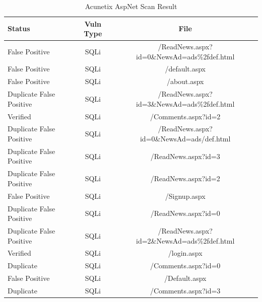 \documentclass[12pt,a4paper]{article}
\begin{document}
\begin{center}
    \begin{table}
        \caption{Acunetix AspNet Scan Result}
        \begin{center}
            \begin{tabular}{ | l | c | c | }
                \hline
                Status & Vuln Type & File \\ \hline
                False Positive & SQLi & /ReadNews.aspx?id=0\&NewsAd=ads\%2fdef.html \\ \hline
                False Positive & SQLi & /default.aspx \\ \hline
                False Positive & SQLi & /about.aspx \\ \hline
                Duplicate False Positive & SQLi & /ReadNews.aspx?id=3\&NewsAd=ads\%2fdef.html \\ \hline
                Verified & SQLi & /Comments.aspx?id=2 \\ \hline
                Duplicate False Positive & SQLi & /ReadNews.aspx?id=0\&NewsAd=ads/def.html \\ \hline
                Duplicate False Positive & SQLi & /ReadNews.aspx?id=3 \\ \hline
                Duplicate False Positive & SQLi & /ReadNews.aspx?id=2 \\ \hline
                False Positive & SQLi & /Signup.aspx \\ \hline
                Duplicate False Positive & SQLi & /ReadNews.aspx?id=0 \\ \hline
                Duplicate False Positive & SQLi & /ReadNews.aspx?id=2\&NewsAd=ads\%2fdef.html \\ \hline
                Verified & SQLi & /login.aspx \\ \hline
                Duplicate & SQLi & /Comments.aspx?id=0 \\ \hline
                False Positive & SQLi & /Default.aspx \\ \hline
                Duplicate & SQLi & /Comments.aspx?id=3 \\
                \hline
            \end{tabular}
        \end{center}
    \end{table}
\end{center}
\end{document}

